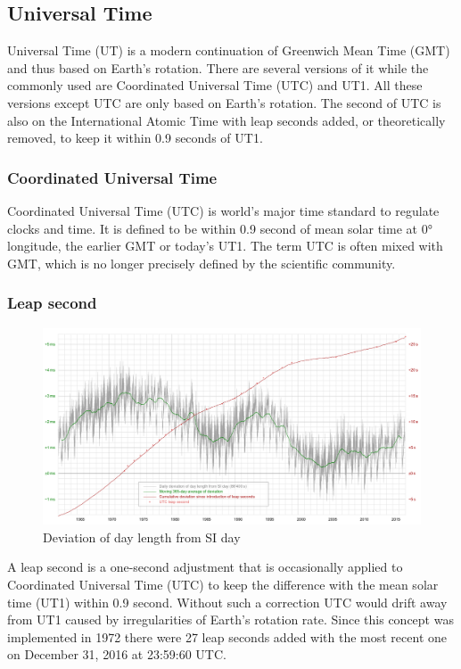 \subsection{Universal Time}

Universal Time (UT) is a modern continuation of Greenwich Mean Time (GMT) and thus based on Earth's rotation.\cite{ut} There are several versions of it while the commonly used are Coordinated Universal Time (UTC) and UT1. All these versions except UTC are only based on Earth's rotation. The second of UTC is also on the International Atomic Time with leap seconds added, or theoretically removed, to keep it within 0.9 seconds of UT1.

\subsubsection{Coordinated Universal Time}

Coordinated Universal Time (UTC) is world's major time standard to regulate clocks and time.\cite{ut} It is defined to be within 0.9 second of mean solar time at 0° longitude, the earlier GMT or today's UT1. The term UTC is often mixed with GMT, which is no longer precisely defined by the scientific community.

\subsubsection{Leap second}

\begin{figure}[tb]
	\centering
	\includegraphics[width=1.0\textwidth]{figures/leap_second.png}
	\caption{Deviation of day length from SI day}
	\label{fig:leap_second}
\end{figure}

A leap second is a one-second adjustment that is occasionally applied to Coordinated Universal Time (UTC) to keep the difference with the mean solar time (UT1) within 0.9 second.\cite{ut} Without such a correction UTC would drift away from UT1 caused by irregularities of Earth's rotation rate. Since this concept was implemented in 1972 there were 27 leap seconds added with the most recent one on December 31, 2016 at 23:59:60 UTC.

